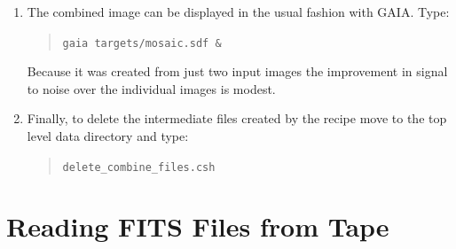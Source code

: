 \documentclass[twoside,11pt]{article}
\newcommand{\xref}[3]{#1}
\newcommand{\xlabel}[1]{}
\begin{document}
\begin{enumerate}
   All the images in subdirectory {\tt targets} with names ending in
   `{\tt \_reg}' are combined into a single image called {\tt mosaic.sdf}.
   The {\tt scale} and {\tt zero} options ensure that {\tt makemos}
   correctly handles images of different exposure time, air mass and
   atmospheric transparency.  The application will run somewhat faster if
   {\tt scale} and {\tt zero} are omitted, but if they are given it should
   produce sensible output from almost any input images.

   For (UKIRT) infrared data the {\tt scale} option does not work well.
   As the frames being combined are usually nearly contemporaneous and have
   the same integration time it is better to omit {\tt scale} and just use
   the {\tt zero} option.

   By default {\tt makemos} combines images using a method known as `median
   stacking'.  This technique involves extracting all the input pixel
   values that contribute to an output image pixel and sorting them into
   rank order.  The median value is computed from this sorted list and
   adopted as the value of the output pixel.  This technique both suppresses
   image noise and removes cosmic-ray hits.  Other methods, such as the
   `clipped mean', are available.  See
   \xref{SUN/139}{sun139}{}\/\cite{SUN139} for full details.

  \item The combined image can be displayed in the usual fashion with
   GAIA.  Type:

  \begin{quote}
   {\tt gaia targets/mosaic.sdf \&}
  \end{quote}

   Because it was created from just two input images the improvement in
   signal to noise over the individual images is modest.

  \item Finally, to delete the intermediate files created by the recipe
   move to the top level data directory and type:

  \begin{quote}
   {\tt delete\_combine\_files.csh}
  \end{quote}

\end{enumerate}


\newpage
\section{\xlabel{READING}\label{READING}Reading FITS Files from Tape}
\end{document}
